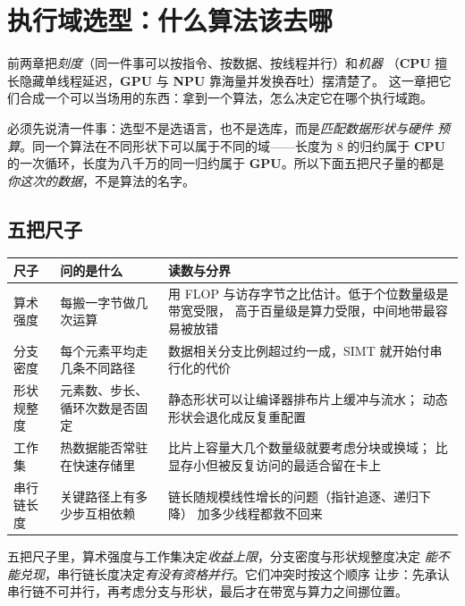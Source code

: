 \documentclass[12pt,a4paper,fontset=fandol]{ctexbook}
\newcommand{\Dom}[1]{\textsf{\bfseries #1}}
\newcommand{\CPU}{\Dom{CPU}}
\newcommand{\GPU}{\Dom{GPU}}
\newcommand{\NPU}{\Dom{NPU}}
\begin{document}
\chapter{执行域选型：什么算法该去哪}

前两章把\emph{刻度}（同一件事可以按指令、按数据、按线程并行）和\emph{机器}
（\CPU{} 擅长隐藏单线程延迟，\GPU{} 与 \NPU{} 靠海量并发换吞吐）摆清楚了。
这一章把它们合成一个可以当场用的东西：拿到一个算法，怎么决定它在哪个执行域跑。

必须先说清一件事：选型不是选语言，也不是选库，而是\emph{匹配数据形状与硬件
预算}。同一个算法在不同形状下可以属于不同的域——长度为 8 的归约属于 \CPU{}
的一次循环，长度为八千万的同一归约属于 \GPU{}。所以下面五把尺子量的都是
\emph{你这次的数据}，不是算法的名字。

\section{五把尺子}

\begin{compare}[title={判据与它们的读数来源}]
\begin{tabular}{@{}>{\raggedright\arraybackslash}p{}
  >{\raggedright\arraybackslash}p{}
  >{\raggedright\arraybackslash}p{}@{}}
\toprule
尺子 & 问的是什么 & 读数与分界 \\
\midrule
算术强度 & 每搬一字节做几次运算 &
  用 FLOP 与访存字节之比估计。低于个位数量级是带宽受限，
  高于百量级是算力受限，中间地带最容易被放错 \\
分支密度 & 每个元素平均走几条不同路径 &
  数据相关分支比例超过约一成，SIMT 就开始付串行化的代价 \\
形状规整度 & 元素数、步长、循环次数是否固定 &
  静态形状可以让编译器排布片上缓冲与流水；
  动态形状会退化成反复重配置 \\
工作集 & 热数据能否常驻在快速存储里 &
  比片上容量大几个数量级就要考虑分块或换域；
  比显存小但被反复访问的最适合留在卡上 \\
串行链长度 & 关键路径上有多少步互相依赖 &
  链长随规模线性增长的问题（指针追逐、递归下降）
  加多少线程都救不回来 \\
\bottomrule
\end{tabular}
\end{compare}

五把尺子里，算术强度与工作集决定\emph{收益上限}，分支密度与形状规整度决定
\emph{能不能兑现}，串行链长度决定\emph{有没有资格并行}。它们冲突时按这个顺序
让步：先承认串行链不可并行，再考虑分支与形状，最后才在带宽与算力之间挪位置。
\end{document}
